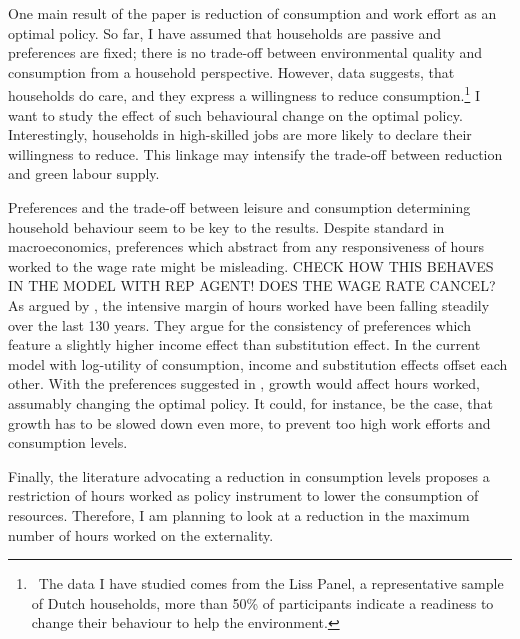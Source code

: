 One main result of the paper is reduction of consumption and work effort as an optimal policy. So far, I have assumed that households are passive and preferences are fixed; there is no trade-off between environmental quality and consumption from a household perspective.
However, data suggests, that households do care, and they express a willingness to reduce consumption.\footnote{\ The data I have studied comes from the Liss Panel, a representative sample of Dutch households, more than 50\% of participants indicate a readiness to change their behaviour to help the environment.} I want to study the effect of such behavioural  change on the optimal policy. Interestingly, households in high-skilled jobs are more likely to declare their willingness to reduce. This linkage may intensify the trade-off between reduction and green labour supply. 


Preferences and the trade-off between leisure and consumption determining household behaviour seem to be key to the results. Despite standard in macroeconomics, preferences which abstract from any responsiveness of hours worked to the wage rate might be misleading. CHECK HOW THIS BEHAVES IN THE MODEL WITH REP AGENT! DOES THE WAGE RATE CANCEL? As argued by \cite{Boppart2019LaborPerspectiveb}, the intensive margin of hours worked have been falling steadily over the last 130 years. They argue for the consistency of preferences which feature a slightly higher income effect than substitution effect. In the current model with log-utility of consumption, income and substitution effects offset each other. With the preferences suggested in \cite{Boppart2019LaborPerspectiveb}, growth would affect hours worked, assumably changing the optimal policy. It could, for instance, be the case, that growth has to be slowed down even more, to prevent too high work efforts and consumption levels. %

Finally, the literature advocating a reduction in consumption levels \cite{Schor2005SustainableReduction} proposes a restriction of hours worked as policy instrument to lower the consumption of resources. Therefore, I am planning to look at a reduction in the maximum number of hours worked on the externality. 

